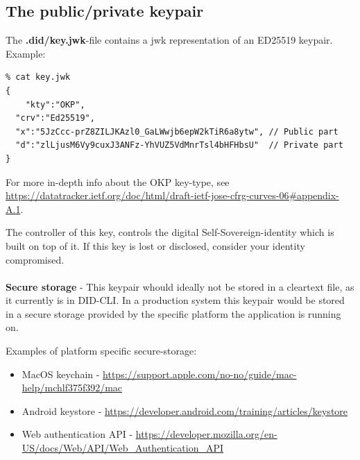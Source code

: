 \pagebreak




\hypertarget{the-publicprivate-keypair}{%
\subsection{The public/private
keypair}\label{the-publicprivate-keypair}}

The \textbf{.did/key.jwk}-file contains a jwk representation of an
ED25519 keypair. Example:

\begin{lstlisting}
% cat key.jwk 
{
    "kty":"OKP",
  "crv":"Ed25519",
  "x":"5JzCcc-prZ8ZILJKAzl0_GaLWwjb6epW2kTiR6a8ytw", // Public part
  "d":"zlLjusM6Vy9cuxJ3ANFz-YhVUZ5VdMnrTsl4bHFHbsU"  // Private part
}
\end{lstlisting}

For more in-depth info about the OKP key-type, see
\url{https://datatracker.ietf.org/doc/html/draft-ietf-jose-cfrg-curves-06\#appendix-A.1}.

The controller of this key, controls the digital Self-Sovereign-identity
which is built on top of it. If this key is lost or disclosed, consider
your identity compromised.



\paragraph{}
\textbf{Secure storage} - This keypair whould ideally not be stored in a cleartext file, as it
currently is in DID-CLI. In a production system this keypair would be
stored in a secure storage provided by the specific platform the
application is running on.

Examples of platform specific secure-storage:

\begin{itemize}
\tightlist
\item
  MacOS keychain -
  \url{https://support.apple.com/no-no/guide/mac-help/mchlf375f392/mac}
\item
  Android keystore -
  \url{https://developer.android.com/training/articles/keystore}
\item
  Web authentication API -
  \url{https://developer.mozilla.org/en-US/docs/Web/API/Web_Authentication_API}
\end{itemize}



